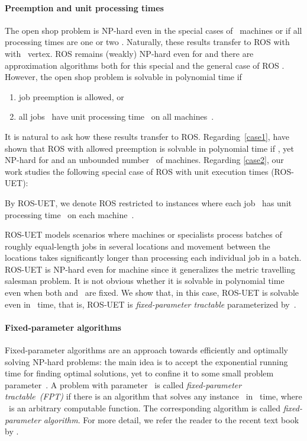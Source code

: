 \documentclass[natbib,sort,smallextended,envcountsame,envcountsect,numbook]{svjour3}
\newcommand{\ROS}{\textsc{ROS}}
\newcommand{\ROSUPT}{\textsc{ROS-UET}}
\begin{document}
\paragraph{Preemption and unit processing times} 
The open shop problem is NP-hard even in the special cases
of ~machines \citep{GS76} or if all processing times are one or two \citep{KSS12}.
Naturally, these results transfer to \ROS{} with
with ~vertex.
\ROS{} remains (weakly) NP-hard
even for  \citep{ABC06}
and there are approximation algorithms
both for this special and the general case of \ROS{}
\citep{ABC05,YLWF11,CKS13,Kon15}.
However, the open shop problem is solvable in polynomial time if
\begin{enumerate}[(1)]
\item\label{case1}job preemption is allowed, or
\item\label{case2}all jobs~ have unit processing time~  on all machines~.
\end{enumerate}

\noindent
It is natural to ask how these results
transfer to \ROS{}.
Regarding~\eqref{case1},
\citet{PCh12} have shown that
\ROS{} with allowed preemption
is solvable in polynomial time
if ,
yet NP-hard for  and
an unbounded number~ of machines.
Regarding \eqref{case2}, our work studies
the following special case of \ROS{} with unit execution times (\ROSUPT):

\begin{problem}
  By \ROSUPT{}, we denote \ROS{} restricted to instances
  where each job~ has unit processing time~ on each
  machine~.
\end{problem}

\noindent
\ROSUPT{} models scenarios where machines or specialists
process batches of roughly equal-length jobs
in several locations and
movement between the locations
takes significantly longer
than processing each individual job in a batch.
\ROSUPT{} is NP-hard even for  machine
since it generalizes the metric travelling salesman problem.
It is not obvious whether it is solvable in polynomial time
even when both  and~ are fixed.
We show that, in this case,
\ROSUPT{} is solvable even in ~time, that is, \ROSUPT{} is
\emph{fixed-parameter tractable} parameterized by~.


\paragraph{Fixed-parameter algorithms}
Fixed-parameter algorithms are an approach towards
efficiently and optimally solving NP-hard problems:
the main idea is to accept the exponential running time
for finding optimal solutions,
yet to confine it
to some small problem parameter~.
A problem with parameter~
is called \emph{fixed-parameter tractable~(FPT)}
if there is an algorithm that solves any instance~
in ~time,
where ~is an arbitrary computable function.
The corresponding algorithm is called \emph{fixed-parameter algorithm}.  
For more detail,
we refer the reader to the recent text book by \citet{CFK+15}.
\end{document}
